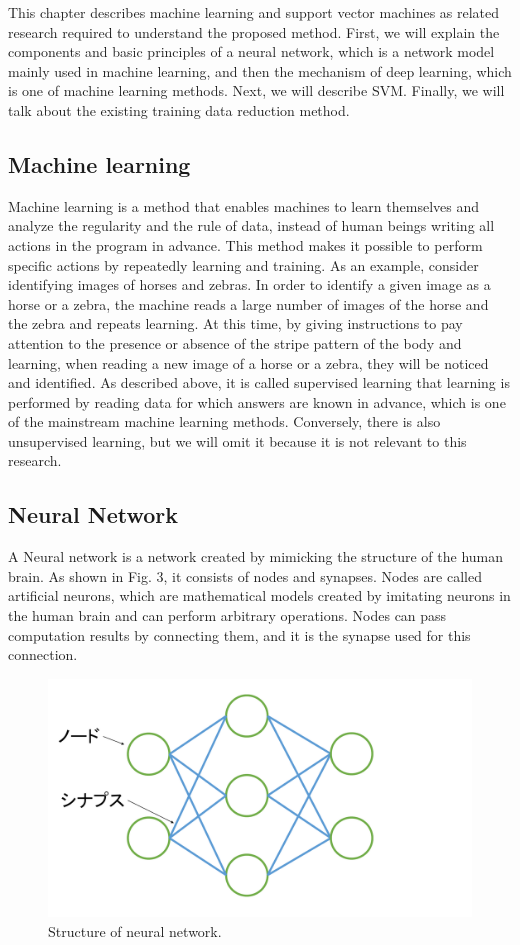This chapter describes machine learning and support vector machines as related research required to understand the proposed method. First, we will explain the components and basic principles of a neural network, which is a network model mainly used in machine learning, and then the mechanism of deep learning, which is one of machine learning methods. Next, we will describe SVM. Finally, we will talk about the existing training data reduction method.

\subsection{Machine learning}
Machine learning is a method that enables machines to learn themselves and analyze the regularity and the rule of data, instead of human beings writing all actions in the program in advance. This method makes it possible to perform specific actions by repeatedly learning and training. As an example, consider identifying images of horses and zebras. In order to identify a given image as a horse or a zebra, the machine reads a large number of images of the horse and the zebra and repeats learning. At this time, by giving instructions to pay attention to the presence or absence of the stripe pattern of the body and learning, when reading a new image of a horse or a zebra, they will be noticed and identified. As described above, it is called supervised learning that learning is performed by reading data for which answers are known in advance, which is one of the mainstream machine learning methods. Conversely, there is also unsupervised learning, but we will omit it because it is not relevant to this research.

\subsection{Neural Network}
A Neural network is a network created by mimicking the structure of the human brain. As shown in Fig. 3, it consists of nodes and synapses. Nodes are called artificial neurons, which are mathematical models created by imitating neurons in the human brain and can perform arbitrary operations. Nodes can pass computation results by connecting them, and it is the synapse used for this connection.
\begin{figure}[t]
\begin{center}
\includegraphics[width=0.6\linewidth]{fig/nn.pdf}
\end{center}
\caption{Structure of neural network.}
\vspace*{-3pt}
\end{figure}


